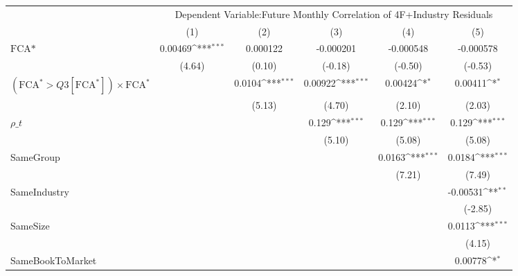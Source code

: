 {
\def\sym#1{\ifmmode^{#1}\else\(^{#1}\)\fi}
\begin{tabular}{l*{5}{c}}
\hline\hline
                &\multicolumn{5}{c}{Dependent Variable:Future Monthly Correlation of 4F+Industry Residuals}    \\\cmidrule(lr){2-6}
                &\multicolumn{1}{c}{(1)}         &\multicolumn{1}{c}{(2)}         &\multicolumn{1}{c}{(3)}         &\multicolumn{1}{c}{(4)}         &\multicolumn{1}{c}{(5)}         \\
\hline
$ \text{FCA*} $ &  0.00469\sym{***}& 0.000122         &-0.000201         &-0.000548         &-0.000578         \\
                &   (4.64)         &   (0.10)         &  (-0.18)         &  (-0.50)         &  (-0.53)         \\
[1em]
 $ (\text{FCA}^* > Q3[\text{FCA}^*]) \times {\text{FCA} ^*}  $ &                  &   0.0104\sym{***}&  0.00922\sym{***}&  0.00424\sym{*}  &  0.00411\sym{*}  \\
                &                  &   (5.13)         &   (4.70)         &   (2.10)         &   (2.03)         \\
[1em]
 $ {\rho\_t} $   &                  &                  &    0.129\sym{***}&    0.129\sym{***}&    0.129\sym{***}\\
                &                  &                  &   (5.10)         &   (5.08)         &   (5.08)         \\
[1em]
SameGroup       &                  &                  &                  &   0.0163\sym{***}&   0.0184\sym{***}\\
                &                  &                  &                  &   (7.21)         &   (7.49)         \\
[1em]
SameIndustry    &                  &                  &                  &                  & -0.00531\sym{**} \\
                &                  &                  &                  &                  &  (-2.85)         \\
[1em]
SameSize        &                  &                  &                  &                  &   0.0113\sym{***}\\
                &                  &                  &                  &                  &   (4.15)         \\
[1em]
SameBookToMarket&                  &                  &                  &                  &  0.00778\sym{*}  \\

\end{tabular}}

